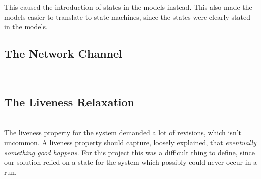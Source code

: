 This caused the introduction of states in the models instead. This also made the models easier to translate to state machines, since the states were clearly stated in the models.

\subsection{The Network Channel} \\




\subsection{The Liveness Relaxation} \\


The liveness property for the system demanded a lot of revisions, which isn't uncommon. A liveness property should capture, loosely explained, that \textit{eventually something good happens}. For this project this was a difficult thing to define, since our solution relied on a state for the system which possibly could never occur in a run. 













